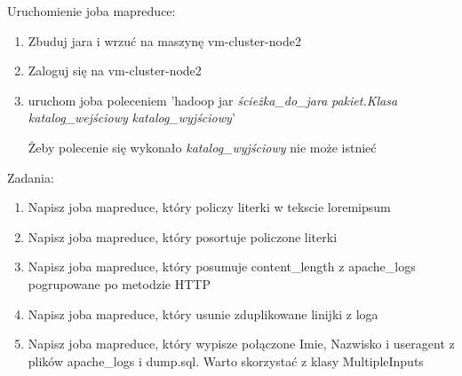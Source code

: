 \documentclass[11pt]{article}
\begin{document}
Uruchomienie joba mapreduce:
\begin{enumerate}
\item Zbuduj jara i wrzuć na maszynę vm-cluster-node2
\item Zaloguj się na vm-cluster-node2
\item uruchom joba poleceniem 'hadoop jar \textit{ścieżka\_do\_jara} \textit{pakiet.Klasa} \textit{katalog\_wejściowy} \textit{katalog\_wyjściowy}'

Żeby polecenie się wykonało \textit{katalog\_wyjściowy} nie może istnieć
\end{enumerate}

Zadania:
\begin{enumerate}
\item Napisz joba mapreduce, który policzy literki w tekscie loremipsum
\item Napisz joba mapreduce, który posortuje policzone literki
\item Napisz joba mapreduce, który posumuje content\_length z apache\_logs pogrupowane po metodzie HTTP
\item Napisz joba mapreduce, który usunie zduplikowane linijki z loga
\item Napisz joba mapreduce, który wypisze połączone Imie, Nazwisko i useragent z plików apache\_logs i dump.sql. Warto skorzystać z klasy MultipleInputs
\end{enumerate}
\end{document}
